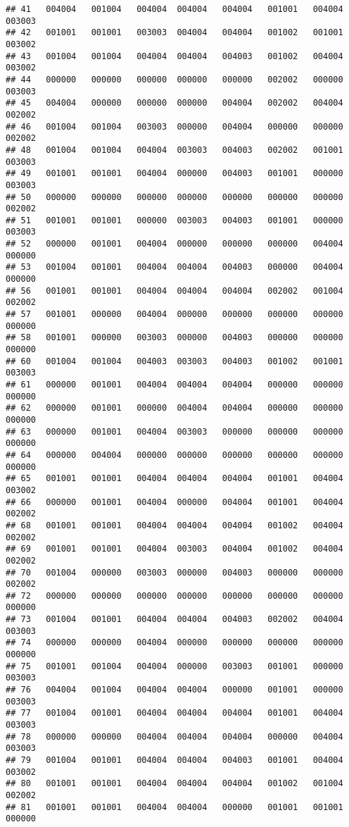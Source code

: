 \documentclass[
]{article}
\begin{document}
\begin{verbatim}
## 41   004004   001004   004004  004004   004004   001001   004004  003003
## 42   001001   001001   003003  004004   004004   001002   001001  003002
## 43   001004   001004   004004  004004   004003   001002   004004  003002
## 44   000000   000000   000000  000000   000000   002002   000000  003003
## 45   004004   000000   000000  000000   004004   002002   004004  002002
## 46   001004   001004   003003  000000   004004   000000   000000  002002
## 48   001004   001004   004004  003003   004003   002002   001001  003003
## 49   001001   001001   004004  000000   004003   001001   000000  003003
## 50   000000   000000   000000  000000   000000   000000   000000  002002
## 51   001001   001001   000000  003003   004003   001001   000000  003003
## 52   000000   001001   004004  000000   000000   000000   004004  000000
## 53   001004   001001   004004  004004   004003   000000   004004  000000
## 56   001001   001001   004004  004004   004004   002002   001004  002002
## 57   001001   000000   004004  000000   000000   000000   000000  000000
## 58   001001   000000   003003  000000   004003   000000   000000  000000
## 60   001004   001004   004003  003003   004003   001002   001001  003003
## 61   000000   001001   004004  004004   004004   000000   000000  000000
## 62   000000   001001   000000  004004   004004   000000   000000  000000
## 63   000000   001001   004004  003003   000000   000000   000000  000000
## 64   000000   004004   000000  000000   000000   000000   000000  000000
## 65   001001   001001   004004  004004   004004   001001   004004  003002
## 66   000000   001001   004004  000000   004004   001001   004004  002002
## 68   001001   001001   004004  004004   004004   001002   004004  002002
## 69   001001   001001   004004  003003   004004   001002   004004  002002
## 70   001004   000000   003003  000000   004003   000000   000000  002002
## 72   000000   000000   000000  000000   000000   000000   000000  000000
## 73   001004   001001   004004  004004   004003   002002   004004  003003
## 74   000000   000000   004004  000000   000000   000000   000000  000000
## 75   001001   001004   004004  000000   003003   001001   000000  003003
## 76   004004   001004   004004  004004   000000   001001   000000  003003
## 77   001004   001001   004004  004004   004004   001001   004004  003003
## 78   000000   000000   004004  004004   004004   000000   004004  003003
## 79   001004   001001   004004  004004   004003   001001   004004  003002
## 80   001001   001001   004004  004004   004004   001002   001004  002002
## 81   001001   001001   004004  004004   000000   001001   001001  000000

\end{verbatim}
\end{document}
